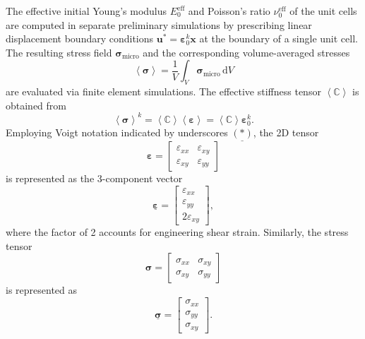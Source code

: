 \documentclass[pdflatex,sn-mathphys-num]{sn-jnl}%
\theoremstyle{thmstyleone}%
\theoremstyle{thmstyletwo}%
\theoremstyle{thmstylethree}%
\begin{document}
The effective initial Young’s modulus $E_0^{\text{eff}}$ and Poisson’s ratio $\nu_0^{\text{eff}}$ of the unit cells are computed in separate preliminary simulations by prescribing linear displacement boundary conditions $\boldsymbol{u}^* = \boldsymbol{\varepsilon}_0^k \boldsymbol{x}$ at the boundary of a single unit cell. The resulting stress field $\boldsymbol{\sigma}_{\text{micro}}$ and the corresponding volume-averaged stresses
\begin{equation}
    \left< \boldsymbol{\sigma} \right> = \dfrac{1}{V} \int_V \boldsymbol{\sigma}_{\text{micro}} \, \mathrm{d}V
\end{equation}
are evaluated via finite element simulations. The effective stiffness tensor $\left< \boldsymbol{\mathbb{C}} \right>$ is obtained from
\begin{equation}
    \left< \boldsymbol{\sigma} \right>^k = \left< \boldsymbol{\mathbb{C}} \right>  \left< \boldsymbol{\varepsilon} \right> = \left< \boldsymbol{\mathbb{C}} \right>  \boldsymbol{\varepsilon}_0^k.
\end{equation}
Employing Voigt notation indicated by underscores $\underline{(*)}$, the 2D  tensor
\[
\boldsymbol{\varepsilon} = 
\begin{bmatrix} \varepsilon_{xx} & \varepsilon_{xy} \\ \varepsilon_{xy} & \varepsilon_{yy} \end{bmatrix}
\]
is represented as the 3-component vector
\begin{equation}
\underline{\boldsymbol{\varepsilon}} = 
\begin{bmatrix} \varepsilon_{xx} \\ \varepsilon_{yy} \\ 2 \varepsilon_{xy} \end{bmatrix},
\end{equation}
where the factor of 2 accounts for engineering shear strain. Similarly, the stress tensor
\[
\boldsymbol{\sigma} = 
\begin{bmatrix} \sigma_{xx} & \sigma_{xy} \\ \sigma_{xy} & \sigma_{yy} \end{bmatrix}
\]
is represented as
\begin{equation}
\underline{\boldsymbol{\sigma}} = 
\begin{bmatrix} \sigma_{xx} \\ \sigma_{yy} \\ \sigma_{xy} \end{bmatrix}.
\end{equation}
\end{document}
